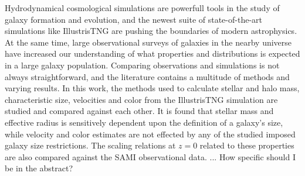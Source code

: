 Hydrodynamical cosmological simulations are powerfull tools in the study of galaxy formation and evolution, and the newest suite of state-of-the-art simulations like IllustrisTNG are pushing the boundaries of modern astrophysics. At the same time, large observational surveys of galaxies in the nearby universe have increased our understanding of what properties and distributions is expected in a large galaxy population. Comparing observations and simulations is not always straightforward, and the literature contains a multitude of methods and varying results. In this work, the methods used to calculate stellar and halo mass, characteristic size, velocities and color from the IllustrisTNG simulation are studied and compared against each other. It is found that stellar mass and effective radius is sensitively dependent upon the definition of a galaxy's size, while velocity and color estimates are not effected by any of the studied imposed galaxy size restrictions. The scaling relations at $z = 0$ related to these properties are also compared against the SAMI observational data.  ... How specific should I be in the abstract?